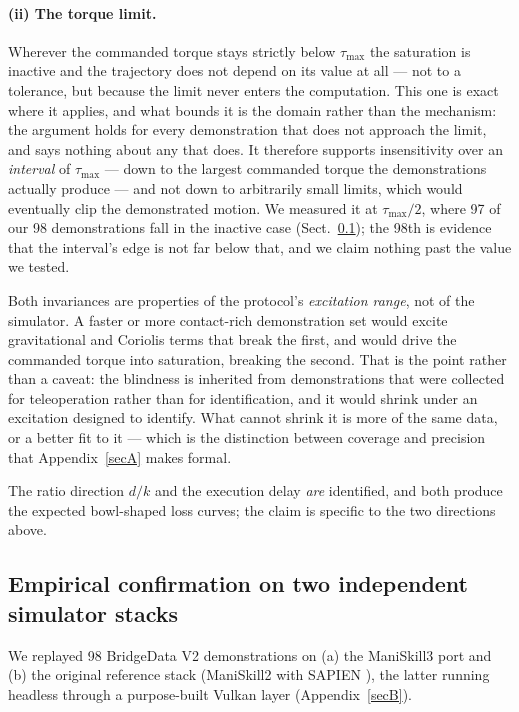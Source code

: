 \documentclass[pdflatex,iicol,sn-apa]{sn-jnl}
\theoremstyle{remark}
\begin{document}
\paragraph{(ii) The torque limit.}
Wherever the commanded torque stays strictly below $\tau_{\max}$ the saturation is inactive and the
trajectory does not depend on its value at all --- not to a tolerance, but because the limit never
enters the computation. This one is exact where it applies, and what bounds it is the domain rather
than the mechanism: the argument holds for every demonstration that does not approach the limit, and
says nothing about any that does. It therefore supports insensitivity over an \emph{interval} of
$\tau_{\max}$ --- down to the largest commanded torque the demonstrations actually produce --- and
not down to arbitrarily small limits, which would eventually clip the demonstrated motion. We
measured it at $\tau_{\max}/2$, where 97 of our 98 demonstrations fall in the inactive case
(Sect.~\ref{subsec4_3}); the 98th is evidence that the interval's edge is not far below that, and we
claim nothing past the value we tested.

Both invariances are properties of the protocol's \emph{excitation range}, not of the simulator. A
faster or more contact-rich demonstration set would excite gravitational and Coriolis terms that
break the first, and would drive the commanded torque into saturation, breaking the second. That is
the point rather than a caveat: the blindness is inherited from demonstrations that were collected
for teleoperation rather than for identification, and it would shrink under an excitation designed
to identify. What cannot shrink it is more of the same data, or a better fit to it --- which is the
distinction between coverage and precision that Appendix~\ref{secA} makes formal.

The ratio direction $d/k$ and the execution delay \emph{are} identified, and both produce the
expected bowl-shaped loss curves; the claim is specific to the two directions above.

\subsection{Empirical confirmation on two independent simulator stacks}\label{subsec4_3}

We replayed 98 BridgeData V2 demonstrations \citep{walke2023bridgedata} on (a) the ManiSkill3 port
\citep{tao2024maniskill3} and (b) the original reference stack (ManiSkill2
\citep{gu2023maniskill2} with SAPIEN \citep{xiang2020sapien}), the latter running headless through a
purpose-built Vulkan layer (Appendix~\ref{secB}).
\end{document}
